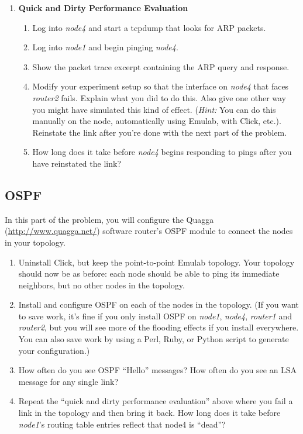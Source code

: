 \documentclass[11pt]{article}
\begin{document}
\begin{enumerate}
\item{\bf Quick and Dirty Performance Evaluation}
  \begin{enumerate}
    \itemsep=-1pt
    \item Log into {\em node4} and start a tcpdump that looks for ARP
      packets. 
    \item Log into {\em node1} and begin pinging {\em node4}.
    \item Show the packet trace excerpt containing the ARP query and response.  
    \item Modify your experiment setup so that the interface on {\em
      node4} that faces {\em router2} fails.  Explain what you did to do
      this.  Also give one other way you might have simulated this kind
      of effect.  ({\em Hint:} You can do this manually on the node,
      automatically using Emulab, with Click, etc.).  Reinstate the link
      after you're done with the next part of the problem.
    \item How long does it take before {\em node4} begins responding to
      pings after you have reinstated the link? 
  \end{enumerate}

\end{enumerate}

\subsection*{OSPF}

In this part of the problem, you will configure the
Quagga (\url{http://www.quagga.net/}) software router's OSPF module to
connect the nodes in your topology.

\begin{enumerate}
\itemsep=-1pt
\item Uninstall Click, but keep the point-to-point Emulab topology.
  Your topology should now be as before: each node should be able to
  ping its immediate neighbors, but no other nodes in the topology. 
\item Install and configure OSPF on each of the nodes in the topology.
  (If you want to save work, it's fine if you only install OSPF on {\em
  node1}, {\em node4}, {\em router1} and {\em router2}, but you will see
  more of the flooding effects if you install everywhere.  You can also
  save work by using a Perl, Ruby, or Python script to generate your
  configuration.)
\item How often do you see OSPF ``Hello'' messages?  How often do you
  see an LSA message for any single link?
\item Repeat the ``quick and dirty performance evaluation'' above where
  you fail a link in the topology and then bring it back.  How long does
  it take before {\em node1}'s routing table entries reflect that node4
  is ``dead''? 
\end{enumerate}
\end{document}

